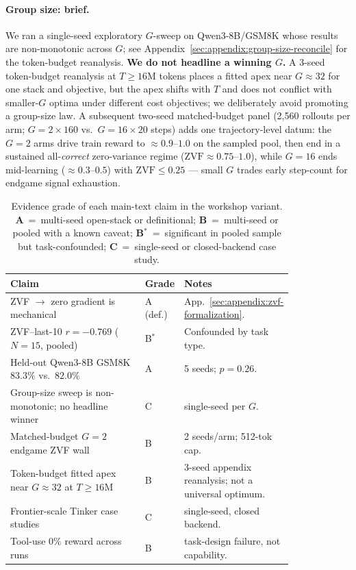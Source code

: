 \documentclass{article}
\begin{document}
\paragraph{Group size: brief.}
We ran a single-seed exploratory $G$-sweep on Qwen3-8B/GSM8K whose results
are non-monotonic across $G$; see
Appendix~\ref{sec:appendix:group-size-reconcile} for the token-budget
reanalysis. \textbf{We do not headline a winning $G$.} A 3-seed
token-budget reanalysis at $T{\ge}16$M tokens places a fitted apex near
$G{\approx}32$ for one stack and objective, but the apex shifts with $T$ and
does not conflict with smaller-$G$ optima under different cost objectives; we
deliberately avoid promoting a group-size law. A subsequent two-seed matched-budget
panel (2{,}560 rollouts per arm; $G{=}2\times160$ vs.\ $G{=}16\times20$
steps) adds one trajectory-level datum: the $G{=}2$ arms drive train
reward to $\approx0.9$--$1.0$ on the sampled pool, then end in a sustained
all-\emph{correct} zero-variance regime ($\mathrm{ZVF}\approx0.75$--$1.0$),
while $G{=}16$ ends mid-learning ($\approx0.3$--$0.5$) with
$\mathrm{ZVF}\le0.25$ --- small $G$ trades early
step-count for endgame signal exhaustion.

\begin{table}[htbp]
\centering\small
\setlength{\tabcolsep}{4pt}
\caption{Evidence grade of each main-text claim in the workshop variant.
\textbf{A}~=~multi-seed open-stack or definitional;
\textbf{B}~=~multi-seed or pooled with a known caveat;
\textbf{B$^{*}$}~=~significant in pooled sample but task-confounded;
\textbf{C}~=~single-seed or closed-backend case study.}
\label{tab:evidence-grade}
\begin{tabular}{@{}p{0.50\linewidth} l p{0.32\linewidth}@{}}
\toprule
\textbf{Claim} & \textbf{Grade} & \textbf{Notes} \\
\midrule
ZVF $\to$ zero gradient is mechanical & A (def.) & App.~\ref{sec:appendix:zvf-formalization}. \\
ZVF--last-10 $r{=}-0.769$ ($N{=}15$, pooled) & B$^{*}$ & Confounded by task type. \\
Held-out Qwen3-8B GSM8K $83.3\%$ vs.\ $82.0\%$ & A & 5 seeds; $p{=}0.26$. \\
Group-size sweep is non-monotonic; no headline winner & C & single-seed per $G$. \\
Matched-budget $G{=}2$ endgame ZVF wall & B & 2 seeds/arm; 512-tok cap. \\
Token-budget fitted apex near $G{\approx}32$ at $T{\ge}16$M & B &
3-seed appendix reanalysis; not a universal optimum. \\
Frontier-scale Tinker case studies & C & single-seed, closed backend. \\
Tool-use $0\%$ reward across runs & B & task-design failure, not capability. \\
\bottomrule
\end{tabular}
\end{table}
\end{document}
